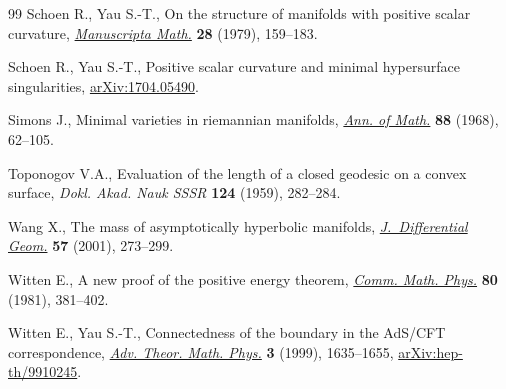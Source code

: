 \documentclass[10pt,a4paper]{amsart}
\numberwithin{equation}{section}
\theoremstyle{definition}
\begin{document}
\begin{thebibliography}{99}
Schoen R., Yau S.-T., On the structure of manifolds with positive scalar
 curvature, \href{https://doi.org/10.1007/BF01647970}{\textit{Manuscripta Math.}} \textbf{28} (1979), 159--183.

Schoen R., Yau S.-T., Positive scalar curvature and minimal hypersurface
 singularities, \href{https://arxiv.org/abs/1704.05490}{arXiv:1704.05490}.

Simons J., Minimal varieties in riemannian manifolds, \href{https://doi.org/10.2307/1970556}{\textit{Ann. of Math.}}
 \textbf{88} (1968), 62--105.

Toponogov V.A., Evaluation of the length of a closed geodesic on a convex
 surface, \textit{Dokl. Akad. Nauk SSSR} \textbf{124} (1959), 282--284.

Wang X., The mass of asymptotically hyperbolic manifolds,
 \href{https://doi.org/10.4310/jdg/1090348112}{\textit{J.~Differential Geom.}} \textbf{57} (2001), 273--299.

Witten E., A new proof of the positive energy theorem, \href{https://doi.org/10.1007/BF01208277}{\textit{Comm. Math.
 Phys.}} \textbf{80} (1981), 381--402.

Witten E., Yau S.-T., Connectedness of the boundary in the {A}d{S}/{CFT}
 correspondence, \href{https://doi.org/10.4310/ATMP.1999.v3.n6.a1}{\textit{Adv. Theor. Math. Phys.}} \textbf{3} (1999),
 1635--1655, \href{https://arxiv.org/abs/hep-th/9910245}{arXiv:hep-th/9910245}.

\end{thebibliography}
\end{document}
